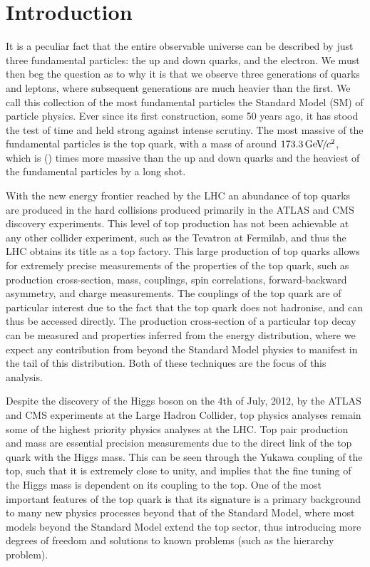\chapter*{Introduction}\label{chap-introduction}

It is a peculiar fact that the entire observable universe can be described by just three fundamental particles: the up and down quarks, and the electron. We must then beg the question as to why it is that we observe three generations of quarks and leptons, where subsequent generations are much heavier than the first. We call this collection of the most fundamental particles the Standard Model (SM) of particle physics. Ever since its first construction, some 50 years ago, it has stood the test of time and held strong against intense scrutiny. The most massive of the fundamental particles is the top quark, with a mass of around $173.3 {\,\text{Ge\hspace{-.08em}V\hspace{-0.16em}/\hspace{-0.08em}}c^\text{2}}$, which is () times more massive than the up and down quarks and the heaviest of the fundamental particles by a long shot. 

With the new energy frontier reached by the LHC an abundance of top quarks are produced in the hard collisions produced primarily in the ATLAS and CMS discovery experiments. This level of top production has not been achievable at any other collider experiment, such as the Tevatron at Fermilab, and thus the LHC obtains its title as a top factory. This large production of top quarks allows for extremely precise measurements of the properties of the top quark, such as production cross-section, mass, couplings, spin correlations, forward-backward asymmetry, and charge measurements. The couplings of the top quark are of particular interest due to the fact that the top quark does not hadronise, and can thus be accessed directly. The production cross-section of a particular top decay can be measured and properties inferred from the energy distribution, where we expect any contribution from beyond the Standard Model physics to manifest in the tail of this distribution. Both of these techniques are the focus of this analysis. 

Despite the discovery of the Higgs boson on the 4th of July, 2012, by the ATLAS and CMS experiments \cite{ATLASHiggs, CMSHiggs} at the Large Hadron Collider, top physics analyses remain some of the highest priority physics analyses at the LHC. Top pair production and mass are essential precision measurements due to the direct link of the top quark with the Higgs mass. This can be seen through the Yukawa coupling of the top, such that it is extremely close to unity, and implies that the fine tuning of the Higgs mass is dependent on its coupling to the top. One of the most important features of the top quark is that its signature is a primary background to many new physics processes beyond that of the Standard Model, where most models beyond the Standard Model extend the top sector, thus introducing more degrees of freedom and solutions to known problems (such as the hierarchy problem).

